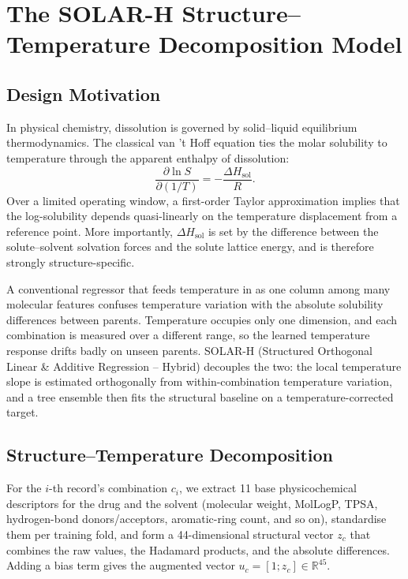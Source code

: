 \section{The SOLAR-H Structure--Temperature Decomposition Model}\label{sec:solar-method}

\subsection{Design Motivation}

In physical chemistry, dissolution is governed by solid--liquid equilibrium thermodynamics. The classical van 't Hoff equation ties the molar solubility to temperature through the apparent enthalpy of dissolution:
\begin{equation}
\frac{\partial \ln S}{\partial (1/T)} = -\frac{\Delta H_{\mathrm{sol}}}{R}.
\end{equation}
Over a limited operating window, a first-order Taylor approximation implies that the log-solubility depends quasi-linearly on the temperature displacement from a reference point. More importantly, $\Delta H_{\mathrm{sol}}$ is set by the difference between the solute--solvent solvation forces and the solute lattice energy, and is therefore strongly structure-specific.

A conventional regressor that feeds temperature in as one column among many molecular features confuses temperature variation with the absolute solubility differences between parents. Temperature occupies only one dimension, and each combination is measured over a different range, so the learned temperature response drifts badly on unseen parents. SOLAR-H (Structured Orthogonal Linear \& Additive Regression -- Hybrid) decouples the two: the local temperature slope is estimated orthogonally from within-combination temperature variation, and a tree ensemble then fits the structural baseline on a temperature-corrected target.

\subsection{Structure--Temperature Decomposition}

For the $i$-th record's combination $c_i$, we extract 11 base physicochemical descriptors for the drug and the solvent (molecular weight, MolLogP, TPSA, hydrogen-bond donors/acceptors, aromatic-ring count, and so on), standardise them per training fold, and form a 44-dimensional structural vector $z_c$ that combines the raw values, the Hadamard products, and the absolute differences. Adding a bias term gives the augmented vector $u_c = [1; z_c] \in \mathbb{R}^{45}$.

